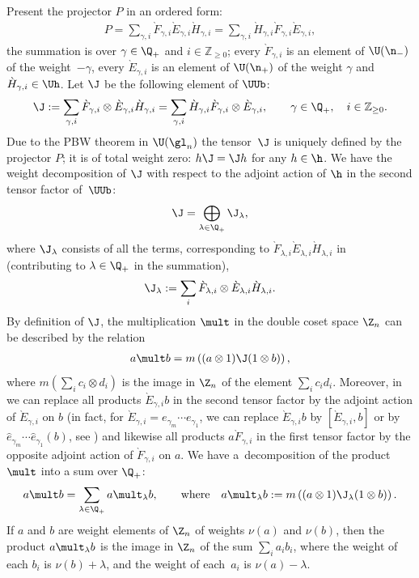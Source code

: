 Present the projector $P$ in an ordered form:
\begin{gather} \label{proof1}
P=
\sum_{\gamma,i}\grave{F}_{\gamma,i}\grave{E}_{\gamma,i}\grave{H}_{\gamma,i}=
\sum_{\gamma,i}\grave{H}_{\gamma,i}\grave{F}_{\gamma,i}\grave{E}_{\gamma,i}  ,
\end{gather}
the summation is over $\gamma\in\Q_+$ and $i\in {\mathbb{Z}}_{\geq 0}$;
every $\grave{F}_{\gamma,i}$ is an element of $\U(\n_-)$ of the weight~$-\gamma$, every
$\grave{E}_{\gamma,i}$ is an element of $\U(\n_+)$ of the weight $\gamma$ and
$\grave{H}_{\gamma,i}\in\Uh$. Let $\J$ be the following element of $\UUb$:
\begin{gather*}
\J :=\sum_{\gamma,i}\grave{F}_{\gamma,i}\otimes\grave{E}_{\gamma,i}\grave{H}_{\gamma,i}=
\sum_{\gamma,i}\grave{H}_{\gamma,i}\grave{F}_{\gamma,i}\otimes\grave{E}_{\gamma,i}  ,\qquad \gamma\in\Q_+  ,\quad i\in {\mathbb{Z}}_{\geq 0}  .
\end{gather*}
Due to the PBW theorem in $\U(\gl_n)$ the tensor~$\J$ is uniquely def\/ined by the projector $P$; it is
of total weight zero: $h\J=\J h$ for any $h\in\h$. We have the weight decomposition of $\J$ with
respect to the adjoint action of $\h$ in the second tensor factor of~$\UUb$:
\begin{gather*}
\J= \bigoplus_{\lambda\in\Q_+}\J_\lambda  ,
\end{gather*}
where $\J_\lambda$ consists of all the terms, corresponding to $\grave{F}_{\lambda,i}\grave{E}_{\lambda,i}
\grave{H}_{\lambda,i}$ in~
(contributing to $\lambda\in\Q_+$ in the summation),
\begin{gather*}
\J_\lambda :=\sum_i\grave{F}_{\lambda,i}\otimes\grave{E}_{\lambda,i}\grave{H}_{\lambda,i}  .
\end{gather*}
By def\/inition of $\J$, the multiplication $\mult$ in the double coset space $\Z_n$ can be described by the relation
\begin{gather}\label{proof4}
a\mult b= m\left( (a\otimes 1)\J (1\otimes b )\right),
\end{gather}
where $m(\sum_ic_i\otimes d_i)$ is the image in $\Z_n$ of the element $\sum_ic_id_i$.
Moreover, in  we can replace all products $\grave{E}_{\gamma,i}b$ in the second tensor
factor by the adjoint action of $\grave{E}_{\gamma,i}$ on $b$ (in fact, for $\grave{E}_{\gamma,i}=e_{\gamma_m}\cdots e_{\gamma_1}$,
we can replace $\grave{E}_{\gamma,i}b$ by $[\grave{E}_{\gamma,i},b]$ or by $\hat{e}_{\gamma_m}\cdots \hat{e}_{\gamma_1}(b)$,
see ) and likewise all products $a\grave{F}_{\gamma,i}$
in the f\/irst tensor factor by the opposite adjoint action of $\grave{F}_{\gamma,i}$ on $a$.
We have a~decomposition of the product $\mult$ into a sum over $\Q_+$:
\begin{gather}\label{proof5}
a\mult b=\sum_{\lambda\in\Q_+}a\mult_\lambda b  ,\qquad\text{where}\quad
a\mult_\lambda b:=m\left( (a\otimes 1)  \J_\lambda (1\otimes b )\right)  .
\end{gather}
If $a$ and $b$ are weight elements of $\Z_n$ of weights $\nu(a)$ and $\nu(b)$, then the product
$a\mult_\lambda b$ is the image in $\Z_n$ of the sum $\sum_i a_ib_i$, where the weight of each
$b_i$ is $\nu(b)+\lambda$, and the weight of each~$a_i$ is $\nu(a)-\lambda$.


